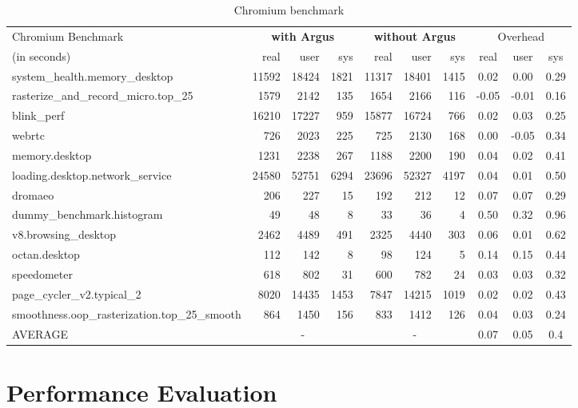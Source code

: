 \begin{table*}[ht]
\footnotesize
\centering
\begin{tabular}{l|rrr|rrr|ccc}
	\hline
	\hline
Chromium Benchmark&\multicolumn{3}{c}{\textbf{with Argus}} & \multicolumn{3}{c}{\textbf{without Argus}} & \multicolumn{3}{c}{Overhead}\\
(in seconds)& real & user & sys & real & user & sys & real & user & sys \\
\hline
system\_health.memory\_desktop & 11592 & 18424 & 1821 & 11317 & 18401 & 1415 & 0.02 & 0.00 & 0.29\\
rasterize\_and\_record\_micro.top\_25 & 1579 & 2142 & 135 & 1654 & 2166 & 116 & -0.05 & -0.01 & 0.16\\
blink\_perf & 16210 & 17227 & 959 & 15877 & 16724 & 766 & 0.02 & 0.03 & 0.25\\
webrtc & 726 & 2023 & 225 & 725 & 2130 & 168 & 0.00 & -0.05 & 0.34\\
memory.desktop & 1231 & 2238 & 267 & 1188 & 2200 & 190 & 0.04 & 0.02 & 0.41\\
loading.desktop.network\_service & 24580 & 52751 & 6294 & 23696 & 52327 & 4197 & 0.04 & 0.01 & 0.50\\
dromaeo & 206 & 227 & 15 & 192 & 212 & 12 & 0.07 & 0.07 & 0.29\\
dummy\_benchmark.histogram & 49 & 48 & 8 & 33 & 36 & 4 & 0.50 & 0.32 & 0.96\\
v8.browsing\_desktop & 2462 & 4489 & 491 & 2325 & 4440 & 303 & 0.06 & 0.01 & 0.62\\
octan.desktop & 112 & 142 & 8 & 98 & 124 & 5 & 0.14 & 0.15 & 0.44\\
speedometer & 618 & 802 & 31 & 600 & 782 & 24 & 0.03 & 0.03 & 0.32\\
page\_cycler\_v2.typical\_2 & 8020 & 14435 & 1453 & 7847 & 14215 & 1019 & 0.02 & 0.02 & 0.43\\
smoothness.oop\_rasterization.top\_25\_smooth & 864 & 1450 & 156 & 833 & 1412 & 126 & 0.04 & 0.03 & 0.24\\
\hline
AVERAGE & \multicolumn{3}{c}{-} &  \multicolumn{3}{c}{-}  & 0.07 & 0.05 & 0.4\\
\hline
\hline
\end{tabular}
\caption{Chromium benchmark}
\label{tab:chromium benchmark}
\end{table*}

\section{Performance Evaluation}\label{sec:evaluation}

